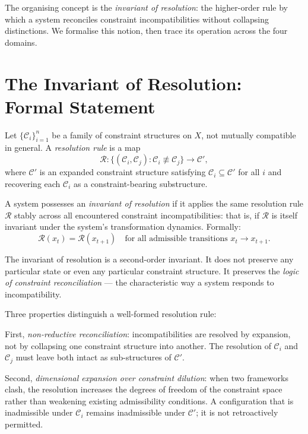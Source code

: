 \documentclass[11pt,openany]{book}
\begin{document}
The organising concept is the \emph{invariant of
resolution}: the higher-order rule by which a system
reconciles constraint incompatibilities without collapsing
distinctions.  We formalise this notion, then trace its
operation across the four domains.

\section{The Invariant of Resolution: Formal Statement}
\label{sec:invariant-formal}

\begin{definition}
\label{def:resolution-rule}
Let $\{\mathcal{C}_i\}_{i=1}^n$ be a family of constraint
structures on $X$, not mutually compatible in general.
A \emph{resolution rule} is a map
\[
  \mathcal{R} : \bigl\{(\mathcal{C}_i, \mathcal{C}_j) :
    \mathcal{C}_i \not\equiv \mathcal{C}_j\bigr\}
    \longrightarrow \mathcal{C}',
\]
where $\mathcal{C}'$ is an expanded constraint structure
satisfying $\mathcal{C}_i \subseteq \mathcal{C}'$ for all
$i$ and recovering each $\mathcal{C}_i$ as a
constraint-bearing substructure.
\end{definition}

\begin{definition}
\label{def:invariant-resolution}
A system possesses an \emph{invariant of resolution} if it
applies the same resolution rule $\mathcal{R}$ stably
across all encountered constraint incompatibilities: that
is, if $\mathcal{R}$ is itself invariant under the system's
transformation dynamics.  Formally:
\[
  \mathcal{R}(x_t) = \mathcal{R}(x_{t+1})
  \quad \text{for all admissible transitions } x_t \to x_{t+1}.
\]
\end{definition}

The invariant of resolution is a second-order invariant.
It does not preserve any particular state or even any
particular constraint structure.  It preserves the
\emph{logic of constraint reconciliation} --- the
characteristic way a system responds to incompatibility.

Three properties distinguish a well-formed resolution rule:

First, \emph{non-reductive reconciliation}: incompatibilities
are resolved by expansion, not by collapsing one constraint
structure into another.  The resolution of $\mathcal{C}_i$
and $\mathcal{C}_j$ must leave both intact as sub-structures
of $\mathcal{C}'$.

Second, \emph{dimensional expansion over constraint
dilution}: when two frameworks clash, the resolution
increases the degrees of freedom of the constraint space
rather than weakening existing admissibility conditions.
A configuration that is inadmissible under $\mathcal{C}_i$
remains inadmissible under $\mathcal{C}'$; it is not
retroactively permitted.
\end{document}
